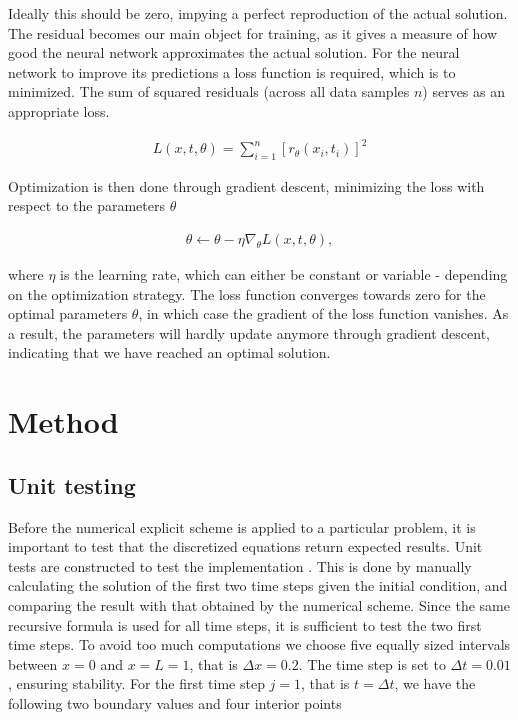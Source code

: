 \documentclass[12pt]{extarticle}
\begin{document}
Ideally this should be zero, impying a perfect reproduction of the actual solution. The residual becomes our main object for training, as it gives a measure of how good the neural network approximates the actual solution. For the neural network to improve its predictions a loss function is required, which is to minimized. The sum of squared residuals (across all data samples $n$) serves as an appropriate loss.

\begin{align*}
	L(x, t, \theta) = \sum_{i=1}^n [r_\theta(x_i,t_i)]^2
\end{align*}

Optimization is then done through gradient descent, minimizing the loss with respect to the parameters $\theta$

\begin{align*}
	\theta \leftarrow \theta - \eta \nabla_{\theta}L(x,t,\theta),
\end{align*}

where $\eta$ is the learning rate, which can either be constant or variable - depending on the optimization strategy.
The loss function converges towards zero for the optimal parameters $\theta$, in which case the gradient of the loss function vanishes. As a result, the parameters will hardly update anymore through gradient descent, indicating that we have reached an optimal solution.


\section{Method}
\subsection*{Unit testing}
Before the numerical explicit scheme is applied to a particular problem, it is important to test that the discretized equations return expected results. Unit tests are constructed to test the implementation . This is done by manually calculating the solution of the first two time steps given the initial condition, and comparing the result with that obtained by the numerical scheme. Since the same recursive formula is used for all time steps, it is sufficient to test the two first time steps. To avoid too much computations we choose five equally sized intervals between $x=0$ and $x=L=1$, that is $\Delta x = 0.2$. The time step is set to $\Delta t = 0.01$, ensuring stability.
For the first time step $j=1$, that is $t=\Delta t$, we have the following two boundary values and four interior points
\end{document}
